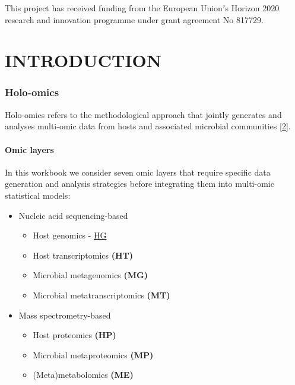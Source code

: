 \documentclass[
]{article}
\providecommand{\tightlist}{%
  \setlength{\itemsep}{0pt}\setlength{\parskip}{0pt}}
\begin{document}
This project has received funding from the European Unionʼs Horizon 2020 research and innovation programme under grant agreement No 817729.

\hypertarget{part-introduction}{%
\part{INTRODUCTION}\label{part-introduction}}

\hypertarget{holo-omics}{%
\section{Holo-omics}\label{holo-omics}}

Holo-omics refers to the methodological approach that jointly generates and analyses multi-omic data from hosts and associated microbial communities {[}\protect\hyperlink{ref-Nyholm-2020}{2}{]}.

\hypertarget{omic-layers}{%
\subsection{Omic layers}\label{omic-layers}}

In this workbook we consider seven omic layers that require specific data generation and analysis strategies before integrating them into multi-omic statistical models:

\begin{itemize}
\tightlist
\item
  Nucleic acid sequencing-based

  \begin{itemize}
  \tightlist
  \item
    Host genomics - \protect\hyperlink{host-genomics}{HG}
  \item
    Host transcriptomics \textbf{(HT)}
  \item
    Microbial metagenomics \textbf{(MG)}
  \item
    Microbial metatranscriptomics \textbf{(MT)}
  \end{itemize}
\item
  Mass spectrometry-based

  \begin{itemize}
  \tightlist
  \item
    Host proteomics \textbf{(HP)}
  \item
    Microbial metaproteomics \textbf{(MP)}
  \item
    (Meta)metabolomics \textbf{(ME)}
  \end{itemize}
\end{itemize}
\end{document}

